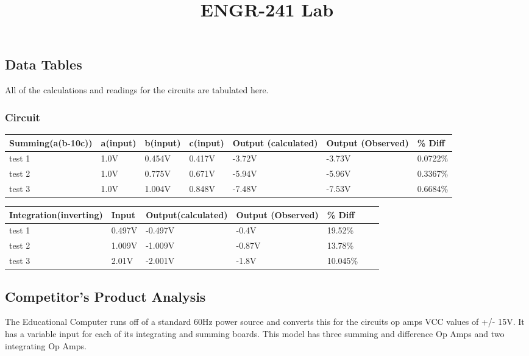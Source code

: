 \documentclass[11pt]{article}
\title{ENGR-241 Lab }
\author{}
\begin{document}
		\subsection*{Data Tables}
All of the calculations and readings for the circuits are tabulated here.\\
\subsubsection*{Circuit}
\begin{table}[h]
	\def\arraystretch{1.2}%
	\begin{tabular}{|l|l|l|l|l|l|l|}
		\hline
		Summing(a(b-10c))	& a(input) 		& b(input)	& c(input)	& Output (calculated)		& Output (Observed) 	& \% Diff			\\ \hline
		test 1		& 1.0V			& 0.454V	& 0.417V	& -3.72V					& -3.73V				&0.0722\%				\\ \hline
		test 2		& 1.0V			& 0.775V	& 0.671V	& -5.94V					& -5.96V				&0.3367\%				\\ \hline
		test 3		& 1.0V			& 1.004V	& 0.848V	& -7.48V					& -7.53V				&0.6684\%				\\ \hline
	
		
	\end{tabular}
\end{table}

\begin{table}[h]
	\def\arraystretch{1.2}%
	\begin{tabular}{|l|l|l|l|l|l|l|}
		\hline
		Integration(inverting)	& Input 		& Output(calculated)	& Output (Observed)	 		& \% Diff			\\ \hline
		test 1					& 0.497V		& -0.497V				& -0.4V						&19.52\%			\\ \hline
		test 2					& 1.009V		& -1.009V				& -0.87V					&13.78\%			\\ \hline
		test 3					& 2.01V			& -2.001V				& -1.8V						&10.045\%			\\ \hline
		
		
	\end{tabular}
\end{table}
\subsection*{Competitor's Product Analysis}
	
	The Educational Computer runs off of a standard 60Hz power source and converts this for the circuits op amps VCC values of +/- 15V. It has a variable input for each of its integrating and summing boards. This model has three summing and difference Op Amps and two integrating Op Amps. \\
	
\end{document}
